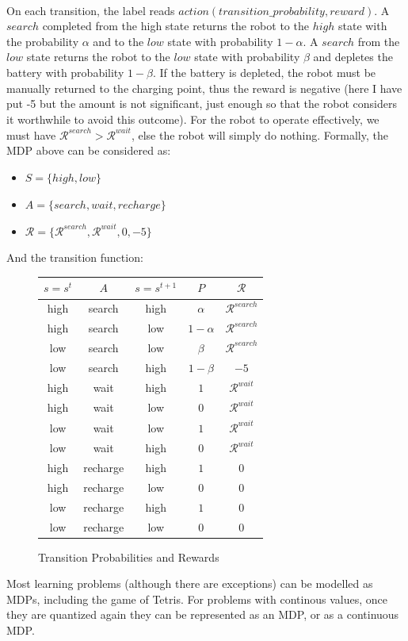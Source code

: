 \documentclass[12pt]{article}
\begin{document}
~\\On each transition, the label reads $action(transition\_probability,reward)$. A $search$ completed from the high state returns the robot to the $high$ state with the probability $\alpha$ and to the $low$ state with probability $1-\alpha$. A $search$ from the $low$ state returns the robot to the $low$ state with probability $\beta$ and depletes the battery with probability $1-\beta$. If the battery is depleted, the robot must be manually returned to the charging point, thus the reward is negative (here I have put -5 but the amount is not significant, just enough so that the robot considers it worthwhile to avoid this outcome). For the robot to operate effectively, we must have $\mathcal{R}^{search}>\mathcal{R}^{wait}$, else the robot will simply do nothing. Formally, the MDP above can be considered as: 
\begin{itemize}
    \item $S = \{high,low\}$
    \item $A = \{search,wait,recharge\}$
    \item $\mathcal{R} = \{\mathcal{R}^{search},\mathcal{R}^{wait},0,-5\}$  
\end{itemize}
And the transition function:
\renewcommand{\arraystretch}{1.2}
\begin{figure}[H]
    \centering
    \begin{tabular}{|c|c|c|c|c|}\hline
        $s=s^t$ & $A$ & $s=s^{t+1}$ & $P$ & $\mathcal{R}$ \\\hline 
        high & search & high & $\alpha$ & $\mathcal{R}^{search}$ \\\hline
        high & search & low & $1-\alpha$ & $\mathcal{R}^{search}$ \\\hline   
        low & search & low & $\beta$ & $\mathcal{R}^{search}$ \\\hline   
        low & search & high & $1-\beta$ & $-5$ \\\hline   
        high & wait & high & $1$ & $\mathcal{R}^{wait}$ \\\hline   
        high & wait & low & $0$ & $\mathcal{R}^{wait}$ \\\hline   
        low & wait & low & $1$ & $\mathcal{R}^{wait}$ \\\hline   
        low & wait & high & $0$ & $\mathcal{R}^{wait}$ \\\hline   
        high & recharge & high & $1$ & $0$ \\\hline   
        high & recharge & low & $0$ & $0$ \\\hline 
        low & recharge & high & $1$ & $0$ \\\hline   
        low & recharge & low & $0$ & $0$ \\\hline       
    \end{tabular}
    \caption{Transition Probabilities and Rewards}
\end{figure}
Most learning problems (although there are exceptions) can be modelled as MDPs, including the game of Tetris. For problems with continous values, once they are quantized again they can be represented as an MDP, or as a continuous MDP.
\end{document}
